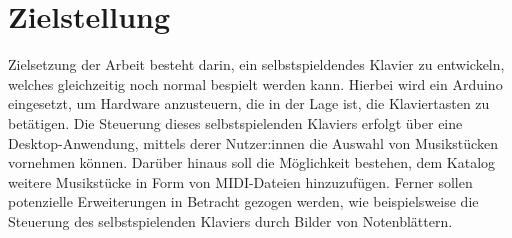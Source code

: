 \chapter{Zielstellung} \label{Zielstellung}

\nocite{*}

Zielsetzung der Arbeit besteht darin, ein selbstspieldendes Klavier zu entwickeln, welches gleichzeitig
noch normal bespielt werden kann. Hierbei wird ein Arduino eingesetzt, um Hardware anzusteuern, die in der
Lage ist, die Klaviertasten zu betätigen. Die Steuerung dieses selbstspielenden Klaviers erfolgt über eine
Desktop-Anwendung, mittels derer Nutzer:innen die Auswahl von Musikstücken vornehmen können. Darüber hinaus
soll die Möglichkeit bestehen, dem Katalog weitere Musikstücke in Form von MIDI-Dateien hinzuzufügen. Ferner
sollen potenzielle Erweiterungen in Betracht gezogen werden, wie beispielsweise die Steuerung des
selbstspielenden Klaviers durch Bilder von Notenblättern.